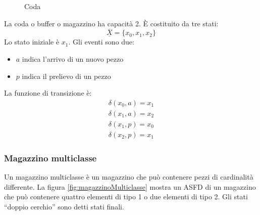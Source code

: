 \documentclass[a4paper]{report}
\begin{document}
\begin{figure}[!h]
  \centering
  \caption{Coda}
  \label{fig:coda}
\end{figure}
La coda o buffer o magazzino ha capacit\`a 2. \`E costituito da tre
stati:
\[
\overline{\underline{X}} = \{ x_0, x_1, x_2\}
\]
Lo stato iniziale \`e $x_1$. Gli eventi sono due:
\begin{itemize}
\item $a$ indica l'arrivo di un nuovo pezzo
\item $p$ indica il prelievo di un pezzo
\end{itemize}
La funzione di transizione \`e:
\[
\begin{array}{l}
  \delta(x_0, a) = x_1\\
  \delta(x_1, a) = x_2\\
  \delta(x_1, p) = x_0\\
  \delta(x_2, p) = x_1
\end{array}
\]

\subsubsection{Magazzino multiclasse}
Un magazzino multiclasse \`e un magazzino che pu\`o contenere pezzi di
cardinalit\`a differente. La figura \ref{fig:magazzinoMulticlasse} mostra
un ASFD di un magazzino che pu\`o contenere quattro elementi di tipo 1
o due elementi di tipo 2. Gli stati ``doppio cerchio'' sono detti
stati finali.
\end{document}
